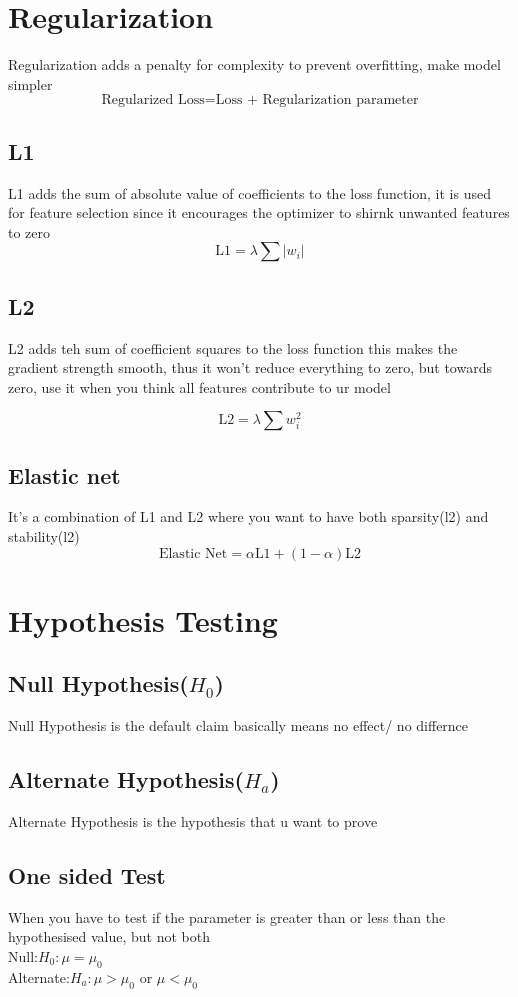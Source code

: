 \documentclass[12pt]{extarticle}
\begin{document}
\section{Regularization}
Regularization adds a penalty for complexity to prevent overfitting, make model simpler
$$\text{Regularized Loss} = \text{Loss + Regularization parameter}$$

\subsection{L1}
L1 adds the sum of absolute value of coefficients to the loss function, 
it is used for feature selection since it encourages the optimizer to shirnk
unwanted features to zero
$$\text{L1} = \lambda \sum|w_i| $$

\subsection{L2}
L2 adds teh sum of coefficient squares to the loss function this 
makes the gradient strength smooth, thus it won't reduce everything 
to zero, but towards zero, use it when you think all features contribute
to ur model

$$ \text{L2} = \lambda \sum w_i^2 $$

\subsection{Elastic net}
It's a combination of L1 and L2 where you want to have both sparsity(l2) 
and stability(l2)
$$ \text{Elastic Net} = \alpha \text{L1} + (1-\alpha)\text{L2} $$

\section{Hypothesis Testing}

\subsection{Null Hypothesis($H_0$)}
Null Hypothesis is the default claim basically means no effect/ no differnce

\subsection{Alternate Hypothesis($H_a$)}
Alternate Hypothesis is the hypothesis that u want to prove

\subsection{One sided Test}
When you have to test if the parameter is greater than or less than the 
hypothesised value, but not both \\
Null:$H_0: \mu = \mu_0 $ \\
Alternate:$H_a: \mu > \mu_0$ or $\mu < \mu_0$
\end{document}
